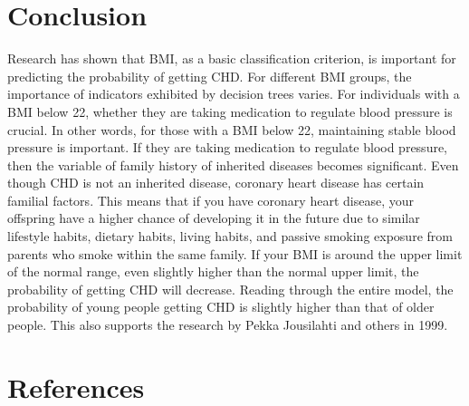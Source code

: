\documentclass[11pt]{article}
\begin{document}
\section{Conclusion}
\text 
Research has shown that BMI, as a basic classification criterion, is important for predicting the probability of getting CHD. For different BMI groups, the importance of indicators exhibited by decision trees varies. For individuals with a BMI below 22, whether they are taking medication to regulate blood pressure is crucial. In other words, for those with a BMI below 22, maintaining stable blood pressure is important. If they are taking medication to regulate blood pressure, then the variable of family history of inherited diseases becomes significant. Even though CHD is not an inherited disease, coronary heart disease has certain familial factors. This means that if you have coronary heart disease, your offspring have a higher chance of developing it in the future due to similar lifestyle habits, dietary habits, living habits, and passive smoking exposure from parents who smoke within the same family. If your BMI is around the upper limit of the normal range, even slightly higher than the normal upper limit, the probability of getting CHD will decrease. Reading through the entire model, the probability of young people getting CHD is slightly higher than that of older people. This also supports the research by Pekka Jousilahti and others in 1999.
\section{References}


\nocite{*}
\end{document}
